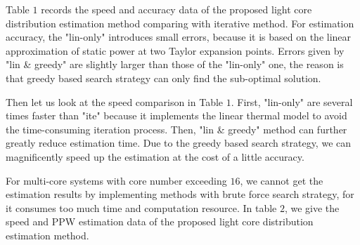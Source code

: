 Table $1$ records the speed and accuracy data of the proposed light core distribution estimation method comparing with iterative method. For estimation accuracy, the "lin-only" introduces small errors, because it is based on the linear approximation of static power at two Taylor expansion points. Errors given by "lin \& greedy" are slightly larger than those of the "lin-only" one, the reason is that greedy based search strategy can only find the sub-optimal solution.

Then let us look at the speed comparison in Table $1$. First, "lin-only" are several times faster than "ite" because it implements the linear thermal model to avoid the time-consuming iteration process. Then, "lin \& greedy" method can further greatly reduce estimation time. Due to the greedy based search strategy, we can magnificently speed up the estimation at the cost of a little accuracy. 

For multi-core systems with core number exceeding $16$, we cannot get the estimation results by implementing methods with brute force search strategy, for it consumes too much time and computation resource. In table $2$, we give the speed and PPW estimation data of the proposed light core distribution estimation method.

